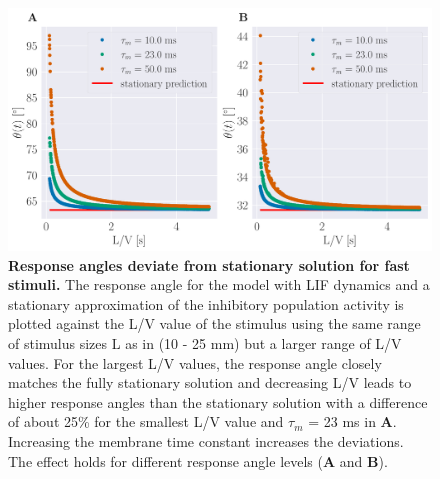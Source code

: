     \begin{figure}[H]
    	\begin{center}
			\includegraphics[width=\textwidth]{figure_station_inh_resp_angle.pdf}
    	\end{center}
    	\caption{\textbf{Response angles deviate from stationary solution for fast stimuli.} The response angle for the model with LIF dynamics and a stationary approximation of the inhibitory population activity is plotted against the L/V value of the stimulus using the same range of stimulus sizes L as in \cite{Bhattacharyya2017} (10 - 25 mm) but a larger range of L/V values. For the largest L/V values, the response angle closely matches the fully stationary solution and decreasing L/V leads to higher response angles than the stationary solution with a difference of about 25\% for the smallest L/V value and $\tau_{m}$ = 23 ms in \textbf{A}. Increasing the membrane time constant increases the deviations. The effect holds for different response angle levels (\textbf{A} and \textbf{B}).}
    	\label{fig:station_inh_resp_angle}
    \end{figure}
    
